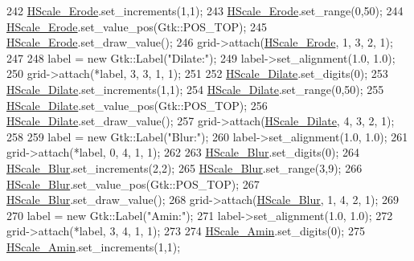 \begin{DoxyCode}
242     \hyperlink{class_vision_g_u_i_ad4bc77416f4e50fa03a7cc7f64a2d78e}{HScale\_Erode}.set\_increments(1,1);
243     \hyperlink{class_vision_g_u_i_ad4bc77416f4e50fa03a7cc7f64a2d78e}{HScale\_Erode}.set\_range(0,50);
244     \hyperlink{class_vision_g_u_i_ad4bc77416f4e50fa03a7cc7f64a2d78e}{HScale\_Erode}.set\_value\_pos(Gtk::POS\_TOP);
245     \hyperlink{class_vision_g_u_i_ad4bc77416f4e50fa03a7cc7f64a2d78e}{HScale\_Erode}.set\_draw\_value();
246     grid->attach(\hyperlink{class_vision_g_u_i_ad4bc77416f4e50fa03a7cc7f64a2d78e}{HScale\_Erode}, 1, 3, 2, 1);
247 
248     label = \textcolor{keyword}{new} Gtk::Label(\textcolor{stringliteral}{"Dilate:"});
249     label->set\_alignment(1.0, 1.0);
250     grid->attach(*label, 3, 3, 1, 1);
251 
252     \hyperlink{class_vision_g_u_i_a6a7c757a11a2699e841b6b49fe18d1de}{HScale\_Dilate}.set\_digits(0);
253     \hyperlink{class_vision_g_u_i_a6a7c757a11a2699e841b6b49fe18d1de}{HScale\_Dilate}.set\_increments(1,1);
254     \hyperlink{class_vision_g_u_i_a6a7c757a11a2699e841b6b49fe18d1de}{HScale\_Dilate}.set\_range(0,50);
255     \hyperlink{class_vision_g_u_i_a6a7c757a11a2699e841b6b49fe18d1de}{HScale\_Dilate}.set\_value\_pos(Gtk::POS\_TOP);
256     \hyperlink{class_vision_g_u_i_a6a7c757a11a2699e841b6b49fe18d1de}{HScale\_Dilate}.set\_draw\_value();
257     grid->attach(\hyperlink{class_vision_g_u_i_a6a7c757a11a2699e841b6b49fe18d1de}{HScale\_Dilate}, 4, 3, 2, 1);
258 
259     label = \textcolor{keyword}{new} Gtk::Label(\textcolor{stringliteral}{"Blur:"});
260     label->set\_alignment(1.0, 1.0);
261     grid->attach(*label, 0, 4, 1, 1);
262 
263     \hyperlink{class_vision_g_u_i_a88fa2852521012287ae804404280c57f}{HScale\_Blur}.set\_digits(0);
264     \hyperlink{class_vision_g_u_i_a88fa2852521012287ae804404280c57f}{HScale\_Blur}.set\_increments(2,2);
265     \hyperlink{class_vision_g_u_i_a88fa2852521012287ae804404280c57f}{HScale\_Blur}.set\_range(3,9);
266     \hyperlink{class_vision_g_u_i_a88fa2852521012287ae804404280c57f}{HScale\_Blur}.set\_value\_pos(Gtk::POS\_TOP);
267     \hyperlink{class_vision_g_u_i_a88fa2852521012287ae804404280c57f}{HScale\_Blur}.set\_draw\_value();
268     grid->attach(\hyperlink{class_vision_g_u_i_a88fa2852521012287ae804404280c57f}{HScale\_Blur}, 1, 4, 2, 1);
269 
270     label = \textcolor{keyword}{new} Gtk::Label(\textcolor{stringliteral}{"Amin:"});
271     label->set\_alignment(1.0, 1.0);
272     grid->attach(*label, 3, 4, 1, 1);
273 
274     \hyperlink{class_vision_g_u_i_a72d3a4fe84821ceafeb4293f196aacd7}{HScale\_Amin}.set\_digits(0);
275     \hyperlink{class_vision_g_u_i_a72d3a4fe84821ceafeb4293f196aacd7}{HScale\_Amin}.set\_increments(1,1);

\end{DoxyCode}
